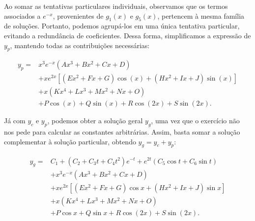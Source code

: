 {  Ao somar as tentativas particulares individuais, observamos que os termos
  associados a $e^{-x}$, provenientes de $g_1(x)$ e $g_5(x)$, pertencem à mesma
  família de soluções. Portanto, podemos agrupá-los em uma única tentativa
  particular, evitando a redundância de coeficientes. Dessa forma,
  simplificamos a expressão de $y_p$, mantendo todas as contribuições
  necessárias:

  \begin{equation}
    \boxed{
      \begin{aligned}
        y_p ={}&
        x^3e^{-x}(Ax^3+Bx^2+Cx+D) \\[4pt]
        &+ xe^{2x}\left[
          (Ex^2+Fx+G)\cos(x)
          +(Hx^2+Ix+J)\sin(x)
        \right] \\[4pt]
        &+ x(Kx^4+Lx^3+Mx^2+Nx+O) \\[4pt]
        &+ P\cos(x)+Q\sin(x)
          +R\cos(2x)+S\sin(2x).
      \end{aligned}
    }
  \end{equation}

  \newpage

  Já com $y_c$ e $y_p$, podemos obter a solução geral $y_g$, uma vez que o
  exercício não nos pede para calcular as constantes arbitrárias. Assim, basta
  somar a solução complementar à solução particular, obtendo $y_g = y_c + y_p$:
  
  \begin{equation}
    \boxed{
      \begin{aligned}
        y_g ={}&
        C_1+(C_2+C_3t+C_4t^2)e^{-t}
        +e^{2t}\left(C_5\cos t+C_6\sin t\right) \\[6pt]
        &+x^3e^{-x}(Ax^3+Bx^2+Cx+D) \\[4pt]
        &+xe^{2x}\left[
          (Ex^2+Fx+G)\cos x
          +(Hx^2+Ix+J)\sin x
        \right] \\[4pt]
        &+x(Kx^4+Lx^3+Mx^2+Nx+O) \\[4pt]
        &+P\cos x+Q\sin x
          +R\cos(2x)+S\sin(2x).
      \end{aligned}
    }
  \end{equation}

}

